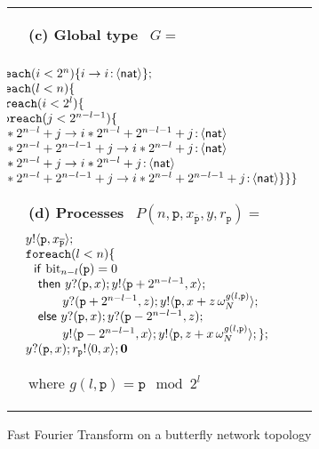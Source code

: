 \documentclass{LMCS}
\newcommand{\ptilde}[1]{{\ensuremath{#1}}}
\newcommand{\kf}[1]{\textup{\textsf{#1}}\xspace}
\newcommand{\pp}{\ensuremath{\at{\p}}}
\newcommand{\x}{\ensuremath{x}}
\newcommand{\participant}[1]{\ensuremath{\mathtt{#1}}}
\newcommand{\p}{\ensuremath{\participant{p}}}
\newcommand{\z}{\ensuremath{z}}
\newcommand{\Pifthenelse}[3]{\ensuremath{\kf{if}\ #1\ \kf{then}\ #2\ \kf{else}\ #3}}
\newcommand{\inact}{\ensuremath{\mathbf{0}}}
\newcommand{\at}[1]{\ensuremath{\ptilde{#1}}}
\newcommand{\G}{\ensuremath{G}}
\newcommand{\Nat}{\kf{nat}}
\newcommand{\ENCan}[1]{\langle #1 \rangle}
\newcommand{\TO}[2]{#1\to #2}
\newcommand{\GS}[3]{\TO{#1}{#2}\colon \!\ENCan{#3}}
\newcommand{\Pout}[4]{\ensuremath{#1!\langle #2,#3\rangle;#4}}
\newcommand{\Pin}[4]{\ensuremath{#1?(#2,#3);#4}}
\newcommand{\y}{\ensuremath{y}}
\newcommand{\ii}{\ensuremath{i}}
\newcommand{\PP}{\ensuremath{P}}
\newcommand{\bit}[1]{\ensuremath{\text{bit}_{#1}}}
\newcommand{\FOREACH}[3]{\ensuremath{\mathtt{foreach}(#1 #2)\{#3\}}}
\begin{document}
\begin{figure}[t]
\begin{tabular}{@{}c@{}l@{}}
&

\begin{minipage}{30em}
\vspace{-6ex}
{\bf \textsf (c) Global type} \ {$\G=$
\vspace{-1ex}
$$\begin{array}{l@{\hspace{-4em}}l}
&\Pi n.  \\
& \FOREACH{\ii}{<2^n}{\GS{i}{i}{\Nat}};\\
& \FOREACH{l}{<n}{\\
  & \hspace{0.5em} \FOREACH{i}{<2^l}{ \\
    & \hspace{0.9em} \FOREACH{j}{<2^{n-l-1}}{ \\
      &  \hspace{1.2em} \GS{i*2^{n-l}+j}{i*2^{n-l}+2^{n-l-1}+j}{\Nat}  \\
      &  \hspace{1.2em} \GS{i*2^{n-l}+2^{n-l-1}+j}{i*2^{n-l}+j}{\Nat}  \\
      &  \hspace{1.2em} \GS{i*2^{n-l}+j}{i*2^{n-l}+j}{\Nat}  \\
      &  \hspace{1.2em} \GS{i*2^{n-l}+2^{n-l-1}+j}{i*2^{n-l}+2^{n-l-1}+j}{\Nat} 
}}}\\
\end{array}$$
}



{\bf \textsf (d) Processes} \ {\small $\PP(n,\pp,x_{\overline{\pp}},y,r_{\p}) =$}
\vspace{-1ex}
{\small
$$\begin{array}{@{\hspace{-3em}}l} \ \Pout{\y}{\p}{\x_{\overline{\pp}}}{}\\
 \ \FOREACH{l}{<n}{\\
 \quad
    \Pifthenelse{\bit{n-l}(\pp)=0\\
 \quad}{\Pin{\y}{\p}{\x}{\Pout{\y}{\p+2^{n-l-1}}{\x}{\\
 \hspace{3.3em}\Pin{y}{\p+2^{n-l-1}}{\z}{\Pout{\y}{\p}{\x+\z\,\omega_N^{g(l,\pp)}}{}}}}\\
\quad}{\Pin{\y}{\p}{\x}{\Pin{y}{\p-2^{n-l-1}}{\z}{\\
\hspace{3.3em}\Pout{\y}{\p-2^{n-l-1}}{\x}
      {\Pout{\y}{\p}{\z+\x\,\omega_N^{g(l,\pp)}}{}}}}}};\\
\ \Pin{\y}{\p}{\x}{\Pout{r_{\p}}{0}{x}}\inact
\end{array}$$}
\vspace{-2ex}

\noindent where $g(l,\pp)=\pp \mod 2^l$
\end{minipage}
\end{tabular}
\caption{Fast Fourier Transform on a butterfly network topology}\label{fig:fft}
\end{figure}
 
\end{document}
